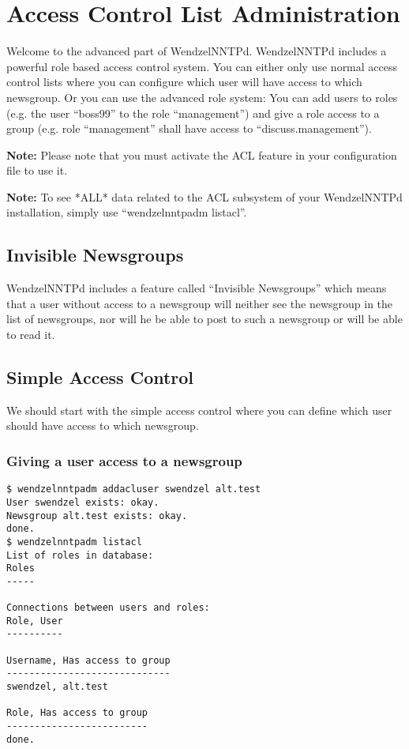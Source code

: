 \section{Access Control List Administration}

Welcome to the advanced part of WendzelNNTPd. WendzelNNTPd includes a powerful role based access control system. You can either only use normal access control lists where you can configure which user will have access to which newsgroup. Or you can use the advanced role system: You can add users to roles (e.g. the user ``boss99'' to the role ``management'') and give a role access to a group (e.g. role ``management'' shall have access to ``discuss.management'').

{\bf Note:} Please note that you must activate the ACL feature in your configuration file to use it.

{\bf Note:} To see *ALL* data related to the ACL subsystem of your WendzelNNTPd installation, simply use ``wendzelnntpadm listacl''.

\subsection{Invisible Newsgroups}

WendzelNNTPd includes a feature called ``Invisible Newsgroups'' which means that a user without access to a newsgroup will neither see the newsgroup in the list of newsgroups, nor will he be able to post to such a newsgroup or will be able to read it.

\subsection{Simple Access Control}

We should start with the simple access control where you can define which user should have access to which newsgroup.

\subsubsection{Giving a user access to a newsgroup}

\begin{verbatim}
$ wendzelnntpadm addacluser swendzel alt.test
User swendzel exists: okay.
Newsgroup alt.test exists: okay.
done.
$ wendzelnntpadm listacl
List of roles in database:
Roles
-----

Connections between users and roles:
Role, User
----------

Username, Has access to group
-----------------------------
swendzel, alt.test

Role, Has access to group
-------------------------
done.
\end{verbatim}

